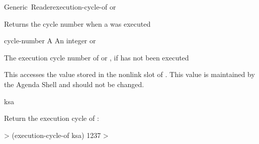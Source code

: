 \documentclass[10pt,twoside,english,pdftex]{article}
\begin{document}
\begin{functiondoc}{Generic~Reader}{execution-cycle-of}{ 
    \returns{}  or \nil}
%
%

\fnsyntax

\fnpurpose Returns the cycle number when a  was executed

\fnmethods
{}

\fnpackage {}

\fnmodule {}

\fnargs
\begin{args}{cycle-number}
\arg[ksa] A 
 An integer or \nil{}
\end{args}

\fnreturns The execution cycle number of  or \nil, if  has
not been executed
  
\fndescription 
This  accesses the value stored in the 
 nonlink slot of . This value is
maintained by the Agenda Shell and should not be changed.

\begin{alsos}{ksa}
\also[ksa]
\end{alsos}

\fnexample
Return the execution cycle of :
%
\W\supp
\begin{example}
  > (execution-cycle-of ksa)
  1237
  >
\end{example}

\end{functiondoc}

 
\end{document}
